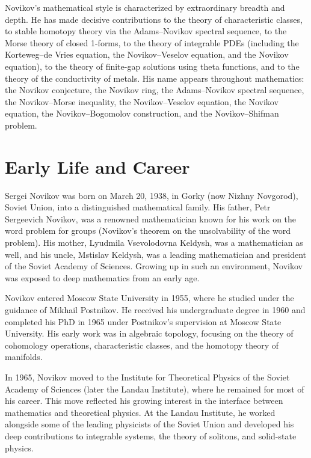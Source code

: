Novikov's mathematical style is characterized by extraordinary breadth and depth. He has made decisive contributions to the theory of characteristic classes, to stable homotopy theory via the Adams--Novikov spectral sequence, to the Morse theory of closed 1-forms, to the theory of integrable PDEs (including the Korteweg--de Vries equation, the Novikov--Veselov equation, and the Novikov equation), to the theory of finite-gap solutions using theta functions, and to the theory of the conductivity of metals. His name appears throughout mathematics: the Novikov conjecture, the Novikov ring, the Adams--Novikov spectral sequence, the Novikov--Morse inequality, the Novikov--Veselov equation, the Novikov equation, the Novikov--Bogomolov construction, and the Novikov--Shifman problem.

\section{Early Life and Career}

Sergei Novikov was born on March 20, 1938, in Gorky (now Nizhny Novgorod), Soviet Union, into a distinguished mathematical family. His father, Petr Sergeevich Novikov, was a renowned mathematician known for his work on the word problem for groups (Novikov's theorem on the unsolvability of the word problem). His mother, Lyudmila Vsevolodovna Keldysh, was a mathematician as well, and his uncle, Mstislav Keldysh, was a leading mathematician and president of the Soviet Academy of Sciences. Growing up in such an environment, Novikov was exposed to deep mathematics from an early age.

Novikov entered Moscow State University in 1955, where he studied under the guidance of Mikhail Postnikov. He received his undergraduate degree in 1960 and completed his PhD in 1965 under Postnikov's supervision at Moscow State University. His early work was in algebraic topology, focusing on the theory of cohomology operations, characteristic classes, and the homotopy theory of manifolds.

In 1965, Novikov moved to the Institute for Theoretical Physics of the Soviet Academy of Sciences (later the Landau Institute), where he remained for most of his career. This move reflected his growing interest in the interface between mathematics and theoretical physics. At the Landau Institute, he worked alongside some of the leading physicists of the Soviet Union and developed his deep contributions to integrable systems, the theory of solitons, and solid-state physics.

